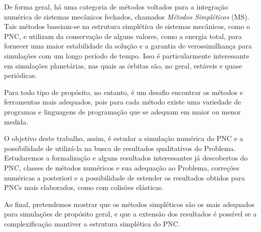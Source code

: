 De forma geral, há uma categoria de métodos voltados para a integração numérica de sistemas
mecânicos fechados, chamados \textit{Métodos Simpléticos} (MS). Tais métodos baseiam-se na
estrutura simplética de sistemas mecânicos, como o PNC, e utilizam da conservação de alguns
valores, como a energia total, para fornecer uma maior estabilidade da solução e a garantia
de verossimilhança para simulações com um longo período de tempo. Isso é particularmente
interessante em simulações planetárias, nas quais as órbitas são, no geral, estáveis e 
quase periódicas.

Para todo tipo de propósito, no entanto, é um desafio encontrar os métodos e ferramentas mais
adequados, pois para cada método existe uma variedade de programas e linguagens de programação
que se adequam em maior ou menor medida.

O objetivo deste trabalho, assim, é estudar a simulação numérica do PNC e a possibilidade de
utilizá-la na busca de resultados qualitativos do Problema. Estudaremos a formalização e alguns
resultados interessantes já descobertos do PNC, classes de métodos numéricos e sua adequação
ao Problema, correções numéricas a posteriori e a possibilidade de estender os resultados obtidos
para PNCs mais elaborados, como com colisões elásticas.

Ao final, pretendemos mostrar que os métodos simpléticos são os mais adequados para simulações
de propósito geral, e que a extensão dos resultados é possível se a complexificação mantiver
a estrutura simplética do PNC.